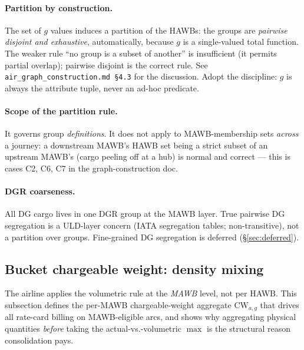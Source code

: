 \documentclass[11pt,a4paper]{article}
\theoremstyle{definition}
\begin{document}
\paragraph{Partition by construction.}
The set of $g$ values induces a partition of the HAWBs: the groups are
\emph{pairwise disjoint and exhaustive}, automatically, because $g$ is a
single-valued total function. The weaker rule ``no group is a subset of
another'' is insufficient (it permits partial overlap); pairwise disjoint is
the correct rule. See \texttt{air\_graph\_construction.md \S4.3} for the
discussion. Adopt the discipline: $g$ is always the attribute tuple, never an
ad-hoc predicate.

\paragraph{Scope of the partition rule.}
It governs group \emph{definitions}. It does not apply to MAWB-membership sets
\emph{across} a journey: a downstream MAWB's HAWB set being a strict subset of
an upstream MAWB's (cargo peeling off at a hub) is normal and correct --- this
is cases C2, C6, C7 in the graph-construction doc.

\paragraph{DGR coarseness.}
All DG cargo lives in one DGR group at the MAWB layer. True pairwise DG
segregation is a ULD-layer concern (IATA segregation tables; non-transitive),
not a partition over groups. Fine-grained DG segregation is deferred
(\S\ref{sec:deferred}).


\subsection{Bucket chargeable weight: density mixing}
\label{sec:cw-density-mixing}

The airline applies the volumetric rule at the \emph{MAWB} level, not per
HAWB. This subsection defines the per-MAWB chargeable-weight aggregate
$\text{CW}_{a,g}$ that drives all rate-card billing on MAWB-eligible arcs,
and shows why aggregating physical quantities \emph{before} taking the
actual-vs.-volumetric $\max$ is the structural reason consolidation pays.
\end{document}
